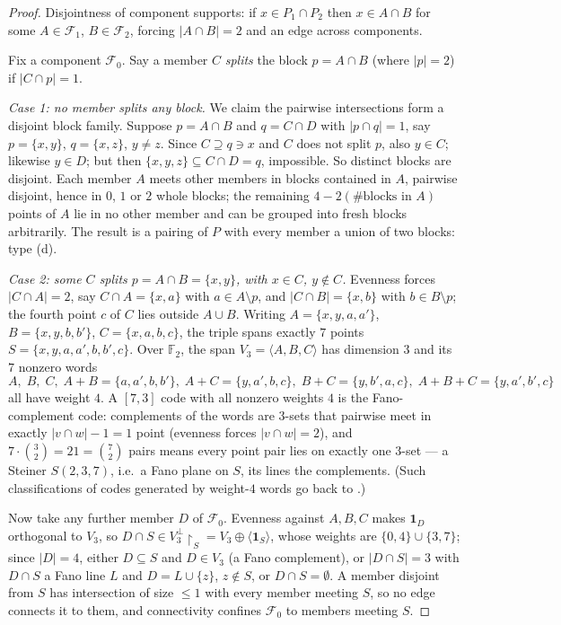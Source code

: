 \documentclass[11pt]{article}
\theoremstyle{remark}
\begin{document}
\begin{proof}
Disjointness of component supports: if $x\in P_1\cap P_2$ then $x\in A\cap
B$ for some $A\in\mathcal F_1$, $B\in\mathcal F_2$, forcing $|A\cap B|=2$
and an edge across components.

Fix a component $\mathcal F_0$. Say a member $C$ \emph{splits} the block
$p=A\cap B$ (where $|p|=2$) if $|C\cap p|=1$.

\emph{Case 1: no member splits any block.} We claim the pairwise
intersections form a disjoint block family. Suppose $p=A\cap B$ and
$q=C\cap D$ with $|p\cap q|=1$, say $p=\{x,y\}$, $q=\{x,z\}$, $y\ne z$.
Since $C\supseteq q\ni x$ and $C$ does not split $p$, also $y\in C$;
likewise $y\in D$; but then $\{x,y,z\}\subseteq C\cap D=q$, impossible.
So distinct blocks are disjoint. Each member $A$ meets other members in
blocks contained in $A$, pairwise disjoint, hence in $0$, $1$ or $2$ whole
blocks; the remaining $4-2(\#\text{blocks in }A)$ points of $A$ lie in no
other member and can be grouped into fresh blocks arbitrarily. The result
is a pairing of $P$ with every member a union of two blocks: type (d).

\emph{Case 2: some $C$ splits $p=A\cap B=\{x,y\}$, with $x\in C$,
$y\notin C$.} Evenness forces $|C\cap A|=2$, say $C\cap A=\{x,a\}$ with
$a\in A\setminus p$, and $|C\cap B|=\{x,b\}$ with $b\in B\setminus p$; the
fourth point $c$ of $C$ lies outside $A\cup B$. Writing $A=\{x,y,a,a'\}$,
$B=\{x,y,b,b'\}$, $C=\{x,a,b,c\}$, the triple spans exactly $7$ points
$S=\{x,y,a,a',b,b',c\}$. Over $\mathbb F_2$, the span
$V_3=\langle A,B,C\rangle$ has dimension $3$ and its $7$ nonzero words
\[
A,\;B,\;C,\;A{+}B=\{a,a',b,b'\},\;A{+}C=\{y,a',b,c\},\;
B{+}C=\{y,b',a,c\},\;A{+}B{+}C=\{y,a',b',c\}
\]
all have weight $4$. A $[7,3]$ code with all nonzero weights $4$ is the
Fano-complement code: complements of the words are $3$-sets that pairwise
meet in exactly $|v\cap w|-1=1$ point (evenness forces $|v\cap w|=2$), and
$7\cdot\binom32=21=\binom72$ pairs means every point pair lies on exactly
one $3$-set --- a Steiner $S(2,3,7)$, i.e.\ a Fano plane on $S$, its lines
the complements. (Such classifications of codes generated by weight-$4$
words go back to \cite{PlessSloane75}.)

Now take any further member $D$ of $\mathcal F_0$. Evenness against
$A,B,C$ makes $\mathbf 1_D$ orthogonal to $V_3$, so $D\cap S\in
V_3^{\perp}\!\restriction_S=V_3\oplus\langle\mathbf 1_S\rangle$, whose
weights are $\{0,4\}\cup\{3,7\}$; since $|D|=4$, either $D\subseteq S$ and
$D\in V_3$ (a Fano complement), or $|D\cap S|=3$ with $D\cap S$ a Fano
line $L$ and $D=L\cup\{z\}$, $z\notin S$, or $D\cap S=\emptyset$. A member
disjoint from $S$ has intersection of size $\le1$ with every member
meeting $S$, so no edge connects it to them, and connectivity confines
$\mathcal F_0$ to members meeting $S$.


\end{proof}
\end{document}
